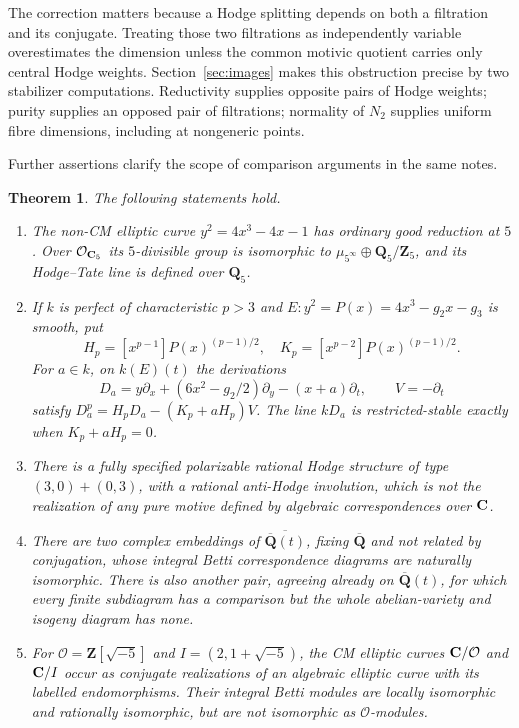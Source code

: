 \documentclass[11pt]{article}
\newtheorem{theorem}{Theorem}[section]
\theoremstyle{definition}\newtheorem{definition}[theorem]{Definition}
\theoremstyle{remark}\newtheorem{remark}[theorem]{Remark}
\newcommand{\Q}{\mathbf Q}\newcommand{\Z}{\mathbf Z}
\newcommand{\Qb}{\overline{\mathbf Q}}\newcommand{\Fp}{\mathbf F_p}
\begin{document}
The correction matters because a Hodge splitting depends on both a filtration and its conjugate. Treating those two filtrations as independently variable overestimates the dimension unless the common motivic quotient carries only central Hodge weights. Section~\ref{sec:images} makes this obstruction precise by two stabilizer computations. Reductivity supplies opposite pairs of Hodge weights; purity supplies an opposed pair of filtrations; normality of $N_2$ supplies uniform fibre dimensions, including at nongeneric points.

Further assertions clarify the scope of comparison arguments in the same notes.
\begin{theorem}\label{thm:other}
The following statements hold.
\begin{enumerate}
\item The non-CM elliptic curve $y^2=4x^3-4x-1$ has ordinary good reduction at $5$. Over $\mathcal O_{\mathbf C_5}$ its $5$-divisible group is isomorphic to $\mu_{5^\infty}\oplus\Q_5/\Z_5$, and its Hodge--Tate line is defined over $\Q_5$.
\item If $k$ is perfect of characteristic $p>3$ and $E:y^2=P(x)=4x^3-g_2x-g_3$ is smooth, put
\[
 H_p=[x^{p-1}]P(x)^{(p-1)/2},\quad
 K_p=[x^{p-2}]P(x)^{(p-1)/2}.
\]
For $a\in k$, on $k(E)(t)$ the derivations
\[
 D_a=y\partial_x+(6x^2-g_2/2)\partial_y-(x+a)\partial_t,
 \qquad V=-\partial_t
\]
satisfy $D_a^p=H_pD_a-(K_p+aH_p)V$. The line $kD_a$ is restricted-stable exactly when $K_p+aH_p=0$.
\item There is a fully specified polarizable rational Hodge structure of type $(3,0)+(0,3)$, with a rational anti-Hodge involution, which is not the realization of any pure motive defined by algebraic correspondences over $\mathbf C$.
\item There are two complex embeddings of $\overline{\Qb(t)}$, fixing $\Qb$ and not related by conjugation, whose integral Betti correspondence diagrams are naturally isomorphic. There is also another pair, agreeing already on $\Qb(t)$, for which every finite subdiagram has a comparison but the whole abelian-variety and isogeny diagram has none.
\item For $\mathcal O=\Z[\sqrt{-5}]$ and $I=(2,1+\sqrt{-5})$, the CM elliptic curves $\mathbf C/\mathcal O$ and $\mathbf C/I$ occur as conjugate realizations of an algebraic elliptic curve with its labelled endomorphisms. Their integral Betti modules are locally isomorphic and rationally isomorphic, but are not isomorphic as $\mathcal O$-modules.
\end{enumerate}
\end{theorem}
\end{document}

